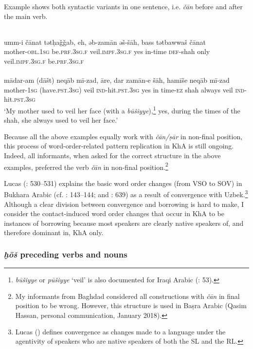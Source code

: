 \documentclass[output=paper,nonflat]{langsci/langscibook}
\begin{document}
Example  shows both syntactic variants in one sentence, i.e. \textit{čān} before and after the main verb.

\ea\label{mother} \\
\gll umm-i čānat tətḥaǧǧab, eh, əb-zamān əš-šāh, bass tətbawwaš čānat\\
     mother-\textsc{obl.1sg} be\textsc{.prf.3sg.f} veil.\textsc{impf.3sg.f} yes in-time \textsc{def}{}-shah only veil.\textsc{impf.3sg.f} be\textsc{.prf.3sg.f}\\
\newpage 
{}\\
\gll mādar-am (dāšt) neqāb mī-zad, āre, dar zamān-e šāh, hamīše neqāb mī-zad \\
     mother-\textsc{1sg} (have.\textsc{pst.3sg}) veil \textsc{ind}-hit.\textsc{pst.3sg} yes in time-\textsc{ez} shah always veil \textsc{ind}-hit.\textsc{pst.3sg}\\
\glt  ‘My mother used to veil her face (with a \textit{būšiyye}),\footnote{\textit{būšiyye} or \textit{pūšiyye} ‘veil’ is also documented for Iraqi Arabic (\citealt{WoodheadEtAl1967}: 53).} yes, during the times of the shah, she always used to veil her face.’ 
\z\z

Because all the above examples equally work with \textit{čān/ṣār} in non-final position, this process of word-order-related pattern replication in KhA is still ongoing. Indeed, all informants, when asked for the correct structure in the above examples, preferred the verb \textit{čān} in non-final position.\footnote{My informants from Baghdad considered all constructions with \textit{čān} in final position to be wrong. However, this structure is used in Baṣra Arabic (Qasim Hassan, personal communication, January 2018).}

Lucas (\citeyear{Lucas2015}: 530–531) explains the basic word order changes (from VSO to SOV) in Bukhara Arabic (cf. \citealt{Ratcliffe2005}: 143–144; and \citealt{Versteegh2010}: 639) as a result of convergence with Uzbek.\footnote{Lucas (\citeyear[525]{Lucas2015}) defines convergence as changes made to a language under the agentivity of speakers who are native speakers of both the SL and the RL.} Although a clear division between convergence and borrowing is hard to make, I consider the contact-induced word order changes that occur in KhA to be instances of borrowing because most speakers are clearly native speakers of, and therefore dominant in, KhA only.


\subsubsection{\textit{ḫōš} preceding verbs and nouns} \label{xosh}
\end{document}
